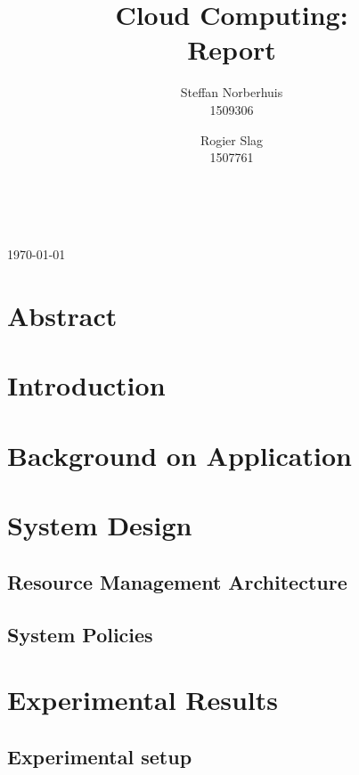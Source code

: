 \documentclass[a4paper]{IEEEtran}
\title{Cloud Computing: \\ Report}
\author{Steffan Norberhuis\\ 1509306 \and
 Rogier Slag\\ 1507761}
\author{
    \IEEEauthorblockN{Steffan Norberhuis, Rogier Slag}\\
    \IEEEauthorblockA{1509306, 1507761}
}
\begin{document}
\maketitle
\begin{center}
\today
\end{center}

\section{Abstract}


\section{Introduction}




\section{Background on Application}

\section{System Design}

\subsection{Resource Management Architecture}






\subsection{System Policies}


\section{Experimental Results}

\subsection{Experimental setup}
\end{document}
